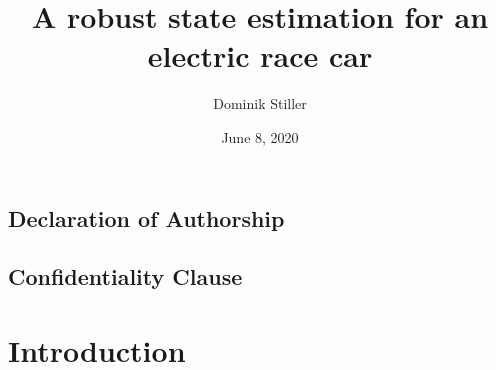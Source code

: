 \title{A robust state estimation for an electric race car}
\author{Dominik Stiller}
\date{June 8, 2020}



\makeglossaries




	\pagestyle{empty}
	\makeatletter
	\begin{titlepage}
		
	\end{titlepage}
	
	\section*{Declaration of Authorship}
	
	\makeatother
	\vfill
	
	\section*{Confidentiality Clause}
	
	\vfill

	\begin{abstract}
		
	\end{abstract}

	\setlength{\cftbeforetoctitleskip}{2.1em}
	\begin{spacing}{1.15}
	   \tableofcontents
	\end{spacing}
	\clearpage
	\thispagestyle{empty}
	
	\pagestyle{plain}
	
	\printacronyms
	\clearpage
	
	\listoffigures
	\clearpage
	\listoftables
	\renewcommand\listoflistingscaption{List of Source Codes}
	\listoflistings
	\clearpage
	
	\printnomenclature
	\clearpage
	
	
	\pagestyle{headings}
	
	\chapter{Introduction}
	
